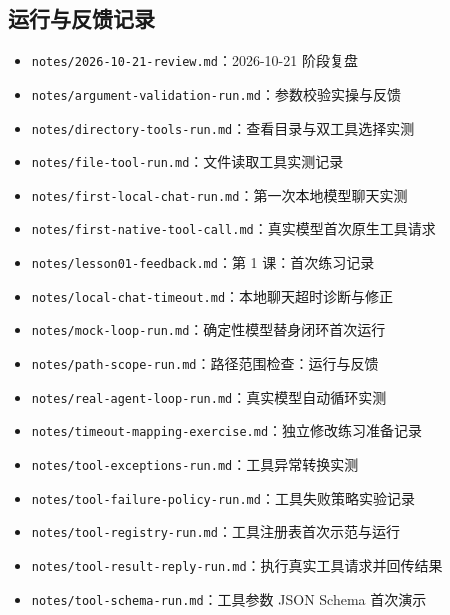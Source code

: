 \subsection{运行与反馈记录}
\begin{itemize}
\item \nolinkurl{notes/2026-10-21-review.md}：2026-10-21 阶段复盘
\item \nolinkurl{notes/argument-validation-run.md}：参数校验实操与反馈
\item \nolinkurl{notes/directory-tools-run.md}：查看目录与双工具选择实测
\item \nolinkurl{notes/file-tool-run.md}：文件读取工具实测记录
\item \nolinkurl{notes/first-local-chat-run.md}：第一次本地模型聊天实测
\item \nolinkurl{notes/first-native-tool-call.md}：真实模型首次原生工具请求
\item \nolinkurl{notes/lesson01-feedback.md}：第 1 课：首次练习记录
\item \nolinkurl{notes/local-chat-timeout.md}：本地聊天超时诊断与修正
\item \nolinkurl{notes/mock-loop-run.md}：确定性模型替身闭环首次运行
\item \nolinkurl{notes/path-scope-run.md}：路径范围检查：运行与反馈
\item \nolinkurl{notes/real-agent-loop-run.md}：真实模型自动循环实测
\item \nolinkurl{notes/timeout-mapping-exercise.md}：独立修改练习准备记录
\item \nolinkurl{notes/tool-exceptions-run.md}：工具异常转换实测
\item \nolinkurl{notes/tool-failure-policy-run.md}：工具失败策略实验记录
\item \nolinkurl{notes/tool-registry-run.md}：工具注册表首次示范与运行
\item \nolinkurl{notes/tool-result-reply-run.md}：执行真实工具请求并回传结果
\item \nolinkurl{notes/tool-schema-run.md}：工具参数 JSON Schema 首次演示
\end{itemize}


